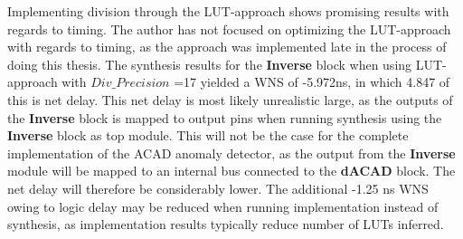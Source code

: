 Implementing division through the LUT-approach shows promising results with regards to timing. The author has not focused on optimizing the LUT-approach with regards to timing, as the approach was implemented late in the process of doing this thesis. The synthesis results for the \textbf{Inverse} block when using LUT-approach with $Div\_Precision$ =17 yielded a WNS of -5.972ns, in which 4.847 of this is net delay. This net delay is most likely unrealistic large, as the outputs of the \textbf{Inverse} block is mapped to output pins when running synthesis using the \textbf{Inverse} block as top module. This will not be the case for the complete implementation of the ACAD anomaly detector, as the output from the \textbf{Inverse} module will be mapped to an internal bus connected to the \textbf{dACAD} block. The net delay will therefore be considerably lower.  The additional -1.25 ns WNS owing to logic delay may be reduced when running implementation instead of synthesis, as implementation results typically reduce number of LUTs inferred.  \\